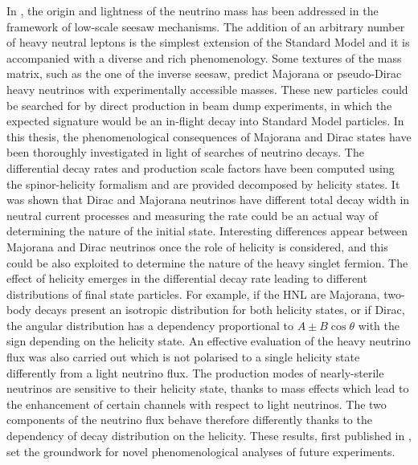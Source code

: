 In , the origin and lightness of the neutrino mass has been addressed %
in the framework of low-scale seesaw mechanisms.
The addition of an arbitrary number of heavy neutral leptons is the simplest extension of the Standard Model %
and it is accompanied with a diverse and rich phenomenology.
Some textures of the mass matrix, such as the one of the inverse seesaw, %
predict Majorana or pseudo-Dirac heavy neutrinos with experimentally accessible masses.
These new particles could be searched for by direct production in beam dump experiments, %
in which the expected signature would be an in-flight decay into Standard Model particles.
In this thesis, the phenomenological consequences of Majorana and Dirac states have been thoroughly investigated %
in light of searches of neutrino decays.
The differential decay rates and production scale factors have been computed using %
the spinor-helicity formalism and are provided decomposed by helicity states.
It was shown that Dirac and Majorana neutrinos have different total decay width in neutral current processes %
and measuring the rate could be an actual way of determining the nature of the initial state.
Interesting differences appear between Majorana and Dirac neutrinos once the role of helicity is considered, %
and this could be also exploited to determine the nature of the heavy singlet fermion.
The effect of helicity emerges in the differential decay rate leading to different %
distributions of final state particles. %
For example, if the HNL are Majorana, two-body decays present an isotropic distribution for both helicity states, %
or if Dirac, the angular distribution has a dependency proportional to $A\pm B \cos\theta$ %
with the sign depending on the helicity state.
An effective evaluation of the heavy neutrino flux was also carried out %
which is not polarised to a single helicity state differently from a light neutrino flux.
The production modes of nearly-sterile neutrinos are sensitive to their helicity state, %
thanks to mass effects which lead to the enhancement of certain channels with respect to light neutrinos.
The two components of the neutrino flux behave therefore differently thanks to the dependency of decay distribution on the helicity.
These results, first published in , set the groundwork for novel phenomenological analyses %
of future experiments.

